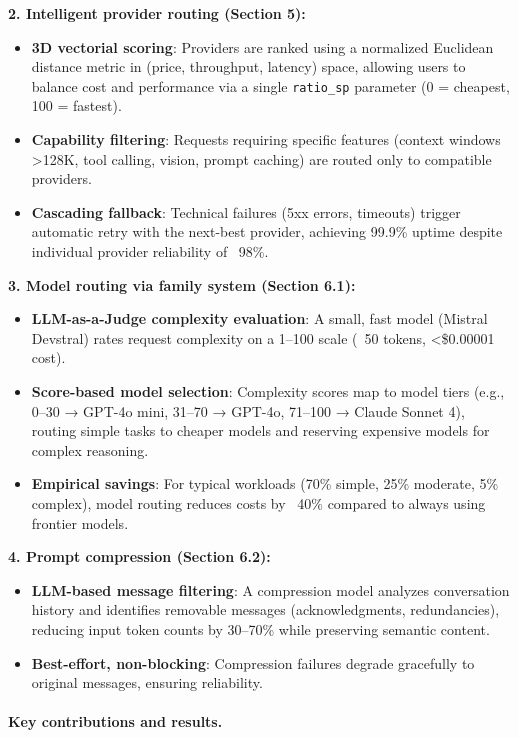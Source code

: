 \documentclass[english]{article}
\begin{document}
\textbf{2. Intelligent provider routing (Section 5):}
\begin{itemize}
    \item \textbf{3D vectorial scoring}: Providers are ranked using a normalized Euclidean distance metric in (price, throughput, latency) space, allowing users to balance cost and performance via a single \texttt{ratio\_sp} parameter (0 = cheapest, 100 = fastest).
    \item \textbf{Capability filtering}: Requests requiring specific features (context windows >128K, tool calling, vision, prompt caching) are routed only to compatible providers.
    \item \textbf{Cascading fallback}: Technical failures (5xx errors, timeouts) trigger automatic retry with the next-best provider, achieving 99.9\% uptime despite individual provider reliability of ~98\%.
\end{itemize}

\textbf{3. Model routing via family system (Section 6.1):}
\begin{itemize}
    \item \textbf{LLM-as-a-Judge complexity evaluation}: A small, fast model (Mistral Devstral) rates request complexity on a 1--100 scale (~50 tokens, <\$0.00001 cost).
    \item \textbf{Score-based model selection}: Complexity scores map to model tiers (e.g., 0--30 → GPT-4o mini, 31--70 → GPT-4o, 71--100 → Claude Sonnet 4), routing simple tasks to cheaper models and reserving expensive models for complex reasoning.
    \item \textbf{Empirical savings}: For typical workloads (70\% simple, 25\% moderate, 5\% complex), model routing reduces costs by ~40\% compared to always using frontier models.
\end{itemize}

\textbf{4. Prompt compression (Section 6.2):}
\begin{itemize}
    \item \textbf{LLM-based message filtering}: A compression model analyzes conversation history and identifies removable messages (acknowledgments, redundancies), reducing input token counts by 30--70\% while preserving semantic content.
    \item \textbf{Best-effort, non-blocking}: Compression failures degrade gracefully to original messages, ensuring reliability.
\end{itemize}

\paragraph{Key contributions and results.}
\end{document}
